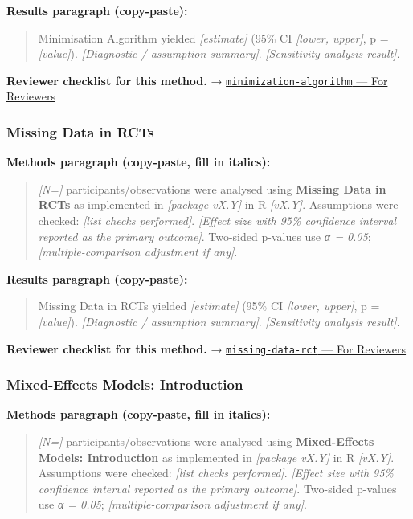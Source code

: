 \documentclass[
]{article}
\begin{document}
\textbf{Results paragraph (copy-paste):}

\begin{quote}
Minimisation Algorithm yielded \emph{{[}estimate{]}} (95\% CI
\emph{{[}lower, upper{]}}, p = \emph{{[}value{]}}). \emph{{[}Diagnostic
/ assumption summary{]}}. \emph{{[}Sensitivity analysis result{]}}.
\end{quote}

\textbf{Reviewer checklist for this method.} →
\href{../chapters/14-clinical/minimization-algorithm.Rmd\#for-reviewers}{\texttt{minimization-algorithm}
--- For Reviewers}

\subsubsection{Missing Data in RCTs}\label{missing-data-in-rcts}

\textbf{Methods paragraph (copy-paste, fill in italics):}

\begin{quote}
\emph{{[}N={]}} participants/observations were analysed using
\textbf{Missing Data in RCTs} as implemented in \emph{{[}package
vX.Y{]}} in R \emph{{[}vX.Y{]}}. Assumptions were checked: \emph{{[}list
checks performed{]}}. \emph{{[}Effect size with 95\% confidence interval
reported as the primary outcome{]}}. Two-sided p-values use \emph{α =
0.05}; \emph{{[}multiple-comparison adjustment if any{]}}.
\end{quote}

\textbf{Results paragraph (copy-paste):}

\begin{quote}
Missing Data in RCTs yielded \emph{{[}estimate{]}} (95\% CI
\emph{{[}lower, upper{]}}, p = \emph{{[}value{]}}). \emph{{[}Diagnostic
/ assumption summary{]}}. \emph{{[}Sensitivity analysis result{]}}.
\end{quote}

\textbf{Reviewer checklist for this method.} →
\href{../chapters/14-clinical/missing-data-rct.Rmd\#for-reviewers}{\texttt{missing-data-rct}
--- For Reviewers}

\subsubsection{Mixed-Effects Models:
Introduction}\label{mixed-effects-models-introduction}

\textbf{Methods paragraph (copy-paste, fill in italics):}

\begin{quote}
\emph{{[}N={]}} participants/observations were analysed using
\textbf{Mixed-Effects Models: Introduction} as implemented in
\emph{{[}package vX.Y{]}} in R \emph{{[}vX.Y{]}}. Assumptions were
checked: \emph{{[}list checks performed{]}}. \emph{{[}Effect size with
95\% confidence interval reported as the primary outcome{]}}. Two-sided
p-values use \emph{α = 0.05}; \emph{{[}multiple-comparison adjustment if
any{]}}.
\end{quote}
\end{document}

